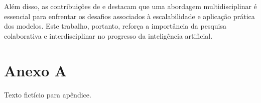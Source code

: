 \documentclass[a4paper,12pt]{report}
\begin{document}
	Além disso, as contribuições de \citet{rao2019} e \citet{brown2020} destacam que uma abordagem multidisciplinar é essencial para enfrentar os desafios associados à escalabilidade e aplicação prática dos modelos. Este trabalho, portanto, reforça a importância da pesquisa colaborativa e interdisciplinar no progresso da inteligência artificial.
	
	\printbibliography
	
	\appendix
	\chapter{Anexo A}
	Texto fictício para apêndice. 
	\lipsum[10]
	
\end{document}
